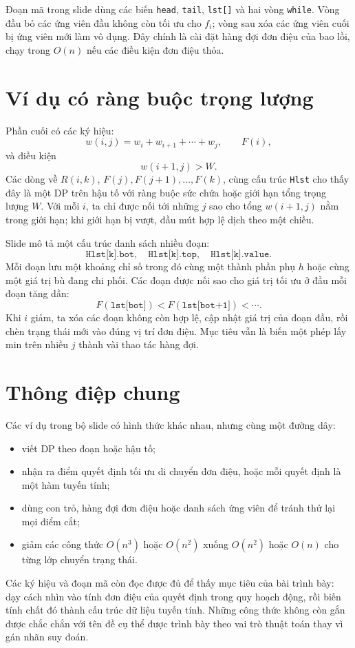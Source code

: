 \documentclass[11pt]{article}
\begin{document}
Đoạn mã trong slide dùng các biến \texttt{head}, \texttt{tail},
\texttt{lst[]} và hai vòng \texttt{while}. Vòng đầu bỏ các ứng viên đầu không
còn tối ưu cho \(f_i\); vòng sau xóa các ứng viên cuối bị ứng viên mới làm
vô dụng. Đây chính là cài đặt hàng đợi đơn điệu của bao lồi, chạy trong
\(O(n)\) nếu các điều kiện đơn điệu thỏa.

\section{Ví dụ có ràng buộc trọng lượng}

Phần cuối có các ký hiệu:
\[
  w(i,j)=w_i+w_{i+1}+\cdots+w_j,\qquad F(i),
\]
và điều kiện
\[
  w(i+1,j)>W.
\]
Các dòng về \(R(i,k)\), \(F(j),F(j+1),\ldots,F(k)\), cùng cấu trúc
\texttt{Hlst} cho thấy đây là một DP trên hậu tố với ràng buộc sức chứa hoặc
giới hạn tổng trọng lượng \(W\). Với mỗi \(i\), ta chỉ được nối tới những
\(j\) sao cho tổng \(w(i+1,j)\) nằm trong giới hạn; khi giới hạn bị vượt, đầu
mút hợp lệ dịch theo một chiều.

Slide mô tả một cấu trúc danh sách nhiều đoạn:
\[
  \texttt{Hlst[k].bot},\quad \texttt{Hlst[k].top},\quad
  \texttt{Hlst[k].value}.
\]
Mỗi đoạn lưu một khoảng chỉ số trong đó cùng một thành phần phụ \(h\) hoặc
cùng một giá trị bù đang chi phối. Các đoạn được nối sao cho giá trị tối ưu ở
đầu mỗi đoạn tăng dần:
\[
  F(\texttt{lst[bot]})<F(\texttt{lst[bot+1]})<\cdots.
\]
Khi \(i\) giảm, ta xóa các đoạn không còn hợp lệ, cập nhật giá trị của đoạn
đầu, rồi chèn trạng thái mới vào đúng vị trí đơn điệu. Mục tiêu vẫn là biến
một phép lấy min trên nhiều \(j\) thành vài thao tác hàng đợi.

\section{Thông điệp chung}

Các ví dụ trong bộ slide có hình thức khác nhau, nhưng cùng một đường dây:
\begin{itemize}
  \item viết DP theo đoạn hoặc hậu tố;
  \item nhận ra điểm quyết định tối ưu di chuyển đơn điệu, hoặc mỗi quyết
        định là một hàm tuyến tính;
  \item dùng con trỏ, hàng đợi đơn điệu hoặc danh sách ứng viên để tránh thử
        lại mọi điểm cắt;
  \item giảm các công thức \(O(n^3)\) hoặc \(O(n^2)\) xuống \(O(n^2)\) hoặc
        \(O(n)\) cho từng lớp chuyển trạng thái.
\end{itemize}

Các ký hiệu và đoạn mã còn đọc được đủ để thấy mục tiêu của bài trình bày:
dạy cách nhìn vào tính đơn điệu của quyết định trong quy hoạch động, rồi biến
tính chất đó thành cấu trúc dữ liệu tuyến tính. Những công thức không còn
gắn được chắc chắn với tên đề cụ thể được trình bày theo vai trò thuật toán
thay vì gán nhãn suy đoán.
\end{document}
